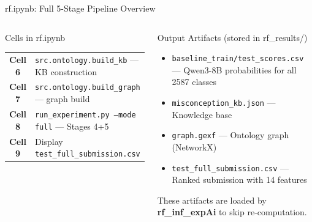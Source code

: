 ﻿\documentclass[aspectratio=169,10pt]{beamer}
\begin{document}
\begin{frame}{rf.ipynb: Full 5-Stage Pipeline Overview}
\begin{columns}[T]
\begin{block}{Cells in rf.ipynb}
\begin{tabular}{cp{6cm}}
\textbf{Cell 6} & \texttt{src.ontology.build\_kb} --- KB construction\\
\textbf{Cell 7} & \texttt{src.ontology.build\_graph} --- graph build\\
\textbf{Cell 8} & \texttt{run\_experiment.py --mode full} --- Stages 4+5\\
\textbf{Cell 9} & Display \texttt{test\_full\_submission.csv}\\
\end{tabular}
\end{block}
\begin{block}{Output Artifacts (stored in rf\_results/)}
\footnotesize
\begin{itemize}
  \item \texttt{baseline\_train/test\_scores.csv} --- Qwen3-8B probabilities for all 2587 classes
  \item \texttt{misconception\_kb.json} --- Knowledge base
  \item \texttt{graph.gexf} --- Ontology graph (NetworkX)
  \item \texttt{test\_full\_submission.csv} --- Ranked submission with 14 features
\end{itemize}
These artifacts are loaded by \textbf{rf\_inf\_expAi} to skip re-computation.
\end{block}
\end{columns}
\end{frame}
\end{document}
